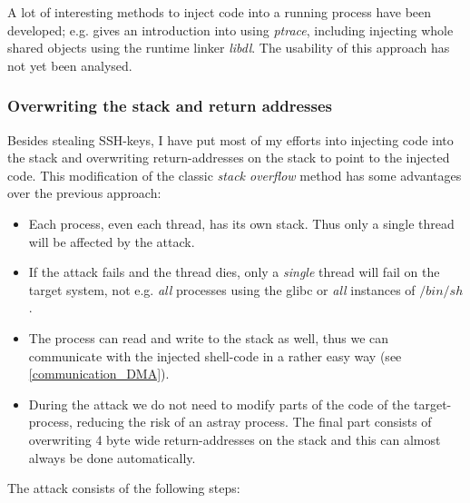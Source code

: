 A lot of interesting methods to inject code into a running process have been
developed; e.g.  \cite{phrack59.8:2002} gives an introduction into using
\emph{ptrace}, including injecting whole shared objects using the runtime linker
\emph{libdl}.  The usability of this approach has not yet been analysed.


\subsubsection{Overwriting the stack and return addresses}

\label{overwriting_stack} Besides stealing SSH-keys, I have put most of my
efforts into injecting code into the stack and overwriting return-addresses on
the stack to point to the injected code. This modification of the classic
\emph{stack overflow} method has some advantages over the previous approach:

\begin{itemize}

	\item Each process, even each thread, has its own stack. Thus only a
		single thread will be affected by the attack.

	\item If the attack fails and the thread dies, only a \emph{single}
		thread will fail on the target system, not e.g. \emph{all}
		processes using the glibc or \emph{all} instances of $/bin/sh$.

	\item The process can read and write to the stack as well, thus we can
		communicate with the injected shell-code in a rather easy way
		(see \ref{communication_DMA}).

	\item During the attack we do not need to modify parts of the code of
		the target-process, reducing the risk of an astray process. The
		final part consists of overwriting 4 byte wide return-addresses
		on the stack and this can almost always be done automatically.

\end{itemize}

The attack consists of the following steps:

